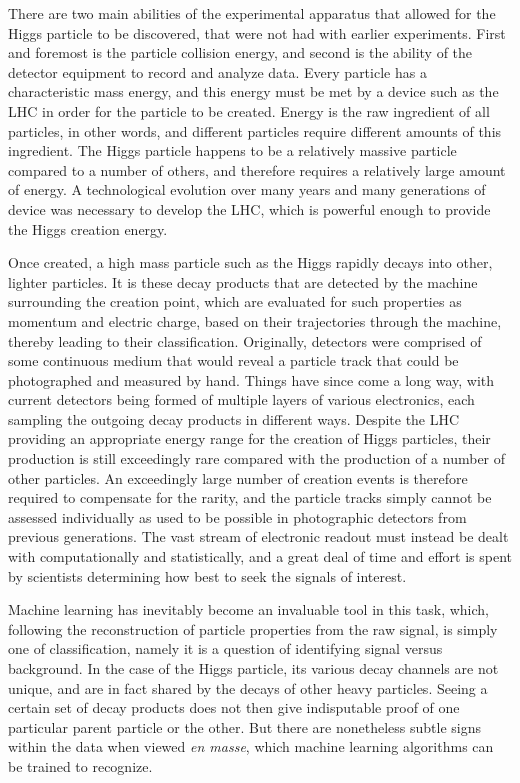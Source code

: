 \documentclass{article} %
\begin{document}
There are two main abilities of the experimental apparatus that allowed for the Higgs particle to be discovered, that were not had with earlier experiments. First and foremost is the particle collision energy, and second is the ability of the detector equipment to record and analyze data. Every particle has a characteristic mass energy, and this energy must be met by a device such as the LHC in order for the particle to be created. Energy is the raw ingredient of all particles, in other words, and different particles require different amounts of this ingredient. The Higgs particle happens to be a relatively massive particle compared to a number of others, and therefore requires a relatively large amount of energy. A technological evolution over many years and many generations of device was necessary to develop the LHC, which is powerful enough to provide the Higgs creation energy.

Once created, a high mass particle such as the Higgs rapidly decays into other, lighter particles. It is these decay products that are detected by the machine surrounding the creation point, which are evaluated for such properties as momentum and electric charge, based on their trajectories through the machine, thereby leading to their classification. Originally, detectors were comprised of some continuous medium that would reveal a particle track that could be photographed and measured by hand. Things have since come a long way, with current detectors being formed of multiple layers of various electronics, each sampling the outgoing decay products in different ways. Despite the LHC providing an appropriate energy range for the creation of Higgs particles, their production is still exceedingly rare compared with the production of a number of other particles. An exceedingly large number of creation events is therefore required to compensate for the rarity, and the particle tracks simply cannot be assessed individually as used to be possible in photographic detectors from previous generations. The vast stream of electronic readout must instead be dealt with computationally and statistically, and a great deal of time and effort is spent by scientists determining how best to seek the signals of interest.

Machine learning has inevitably become an invaluable tool in this task, which, following the reconstruction of particle properties from the raw signal, is simply one of classification, namely it is a question of identifying signal versus background. In the case of the Higgs particle, its various decay channels are not unique, and are in fact shared by the decays of other heavy particles. Seeing a certain set of decay products does not then give indisputable proof of one particular parent particle or the other. But there are nonetheless subtle signs within the data when viewed \textit{en masse}, which machine learning algorithms can be trained to recognize.
\end{document}
